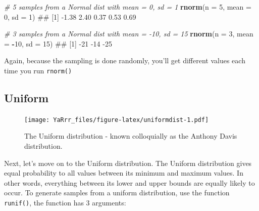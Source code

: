 \documentclass[]{book}
\newenvironment{Shaded}{\begin{snugshade}}{\end{snugshade}}
\newcommand{\KeywordTok}[1]{\textcolor[rgb]{0.13,0.29,0.53}{\textbf{#1}}}
\newcommand{\DataTypeTok}[1]{\textcolor[rgb]{0.13,0.29,0.53}{#1}}
\newcommand{\DecValTok}[1]{\textcolor[rgb]{0.00,0.00,0.81}{#1}}
\newcommand{\CommentTok}[1]{\textcolor[rgb]{0.56,0.35,0.01}{\textit{#1}}}
\newcommand{\OperatorTok}[1]{\textcolor[rgb]{0.81,0.36,0.00}{\textbf{#1}}}
\newcommand{\NormalTok}[1]{#1}
\theoremstyle{definition}
\theoremstyle{definition}
\theoremstyle{remark}
\begin{document}
\begin{Shaded}
\begin{Highlighting}[]
\CommentTok{# 5 samples from a Normal dist with mean = 0, sd = 1}
\KeywordTok{rnorm}\NormalTok{(}\DataTypeTok{n =} \DecValTok{5}\NormalTok{, }\DataTypeTok{mean =} \DecValTok{0}\NormalTok{, }\DataTypeTok{sd =} \DecValTok{1}\NormalTok{)}
\NormalTok{## [1] -1.38  2.40  0.37  0.53  0.69}

\CommentTok{# 3 samples from a Normal dist with mean = -10, sd = 15}
\KeywordTok{rnorm}\NormalTok{(}\DataTypeTok{n =} \DecValTok{3}\NormalTok{, }\DataTypeTok{mean =} \OperatorTok{-}\DecValTok{10}\NormalTok{, }\DataTypeTok{sd =} \DecValTok{15}\NormalTok{)}
\NormalTok{## [1] -21 -14 -25}
\end{Highlighting}
\end{Shaded}

Again, because the sampling is done randomly, you'll get different
values each time you run \texttt{rnorm()}

\subsection{Uniform}\label{uniform}

\begin{figure}
\centering
\texttt{[image: YaRrr\_files/figure-latex/uniformdist-1.pdf]}
\caption{\label{fig:uniformdist}The Uniform distribution - known
colloquially as the Anthony Davis distribution.}
\end{figure}

Next, let's move on to the Uniform distribution. The Uniform
distribution gives equal probability to all values between its minimum
and maximum values. In other words, everything between its lower and
upper bounds are equally likely to occur. To generate samples from a
uniform distribution, use the function \texttt{runif()}, the function
has 3 arguments:
\end{document}
